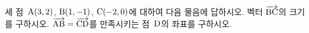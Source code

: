 세 점~$\mathrm{A}(3{,}\mkern3mu\mathopen{}2)$, $\mathrm{B}(1{,}\mkern3mu\mathopen{}-1)$, $\mathrm{C}(-2{,}\mkern3mu\mathopen{}0)$에 대하여 다음 물음에 답하시오.
 벡터 $\overrightarrow{\mathrm{BC}}$의 크기를 구하시오.
 $\overrightarrow{\mathrm{AB}}=\overrightarrow{\mathrm{CD}}$를 만족시키는 점~$\mathrm{D}$의 좌표를 구하시오.
